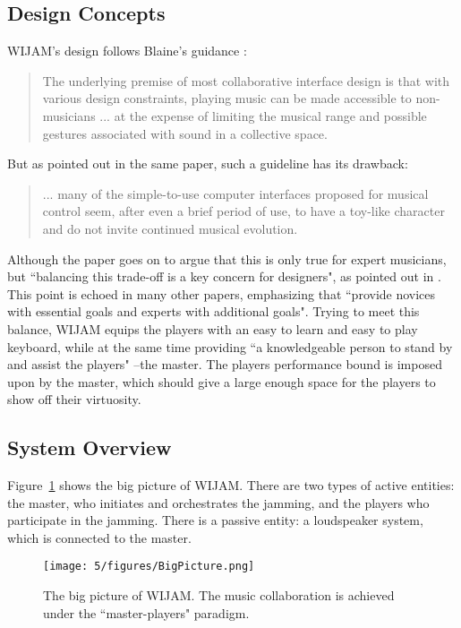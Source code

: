 \subsection{Design Concepts}
WIJAM's design follows Blaine's guidance \cite{Blaine2003}:
\begin{quote}
The underlying premise of most collaborative interface design is that with various design constraints, playing music can be made accessible to non-musicians ... at the expense of limiting the musical range and possible gestures associated with sound in a collective space.
\end{quote}
But as pointed out in the same paper, such a guideline has its drawback:
\begin{quote}
... many of the simple-to-use computer interfaces proposed for musical control seem, after even a brief period of use, to have a toy-like
character and do not invite continued musical evolution.
\end{quote}
Although the paper goes on to argue that this is only true for expert musicians, but ``balancing this trade-off is a key concern for designers", as pointed out in \cite{blaine2003collaborative}. This point is echoed in many other papers\cite{xambo2011multi}, emphasizing that ``provide novices with essential goals and experts with additional goals". Trying to meet this balance, WIJAM equips the players with an easy to learn and easy to play keyboard, while at the same time providing ``a knowledgeable person to stand by and assist the players" \cite{Blaine2003}--the master. The players performance bound is imposed upon by the master, which should give a large enough space for the players to show off their virtuosity.

\subsection{System Overview}
Figure~\ref{fig:5-BigPicture} shows the big picture of WIJAM. There are two types of active entities: the master, who initiates and orchestrates the jamming, and the players who participate in the jamming. There is a passive entity: a loudspeaker system, which is connected to the master.

\begin{figure}[htbp]
    \centering
        \texttt{[image: 5/figures/BigPicture.png]}
    \caption{The big picture of WIJAM. The music collaboration is achieved under the ``master-players" paradigm.}
    \label{fig:5-BigPicture}
\end{figure}

